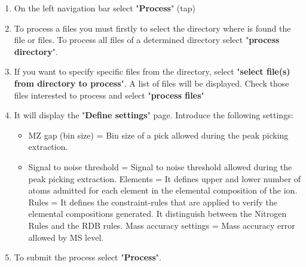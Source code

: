 \documentclass[12pt]{report}
\begin{document}
\begin{enumerate}
 
\item On the left navigation bar select "\textbf{Process}" (tap)
\item To process a files you must firstly to select the directory where is found
the file or files. To process all files of a determined directory select "\textbf{process directory}".

\begin{center}
\begin{figure}[H]
\end{figure}
\end{center}

\item If you want to specify specific files from the directory, select
"\textbf{select file(s) from directory to process}". A list of files will be
displayed. Check those files interested to process and select "\textbf{process files}"

\begin{center}
\begin{figure}[H]
\end{figure}
\end{center}

\item It will display the "\textbf{Define settings}" page.
Introduce the following settings:
\begin{itemize}
    \item MZ gap (bin size) = Bin size of a pick allowed during the peak picking extraction.
	\item Signal to noise threshold = Signal to noise threshold allowed during the
	peak picking extraction.
	Elements = It defines upper and lower number of atoms admitted for each element
in the elemental composition of the ion.
	Rules = It defines the constraint-rules that are applied to verify the
elemental compositions generated. It distinguish between the Nitrogen Rules and the RDB rules.
	Mass accuracy settings = Mass accuracy error allowed by MS level.
\end{itemize}

\begin{center}
\begin{figure}[H]
\end{figure}
\end{center}

\item To submit the process select "\textbf{Process}".


\end{enumerate}
\end{document}
